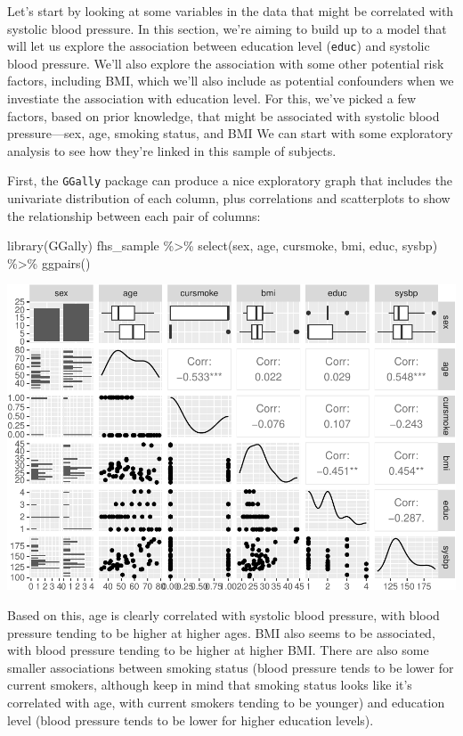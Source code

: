 \documentclass[
]{book}
\newenvironment{Shaded}{\begin{snugshade}}{\end{snugshade}}
\newcommand{\FunctionTok}[1]{\textcolor[rgb]{0.00,0.00,0.00}{#1}}
\newcommand{\NormalTok}[1]{#1}
\newcommand{\SpecialCharTok}[1]{\textcolor[rgb]{0.00,0.00,0.00}{#1}}
\begin{document}
Let's start by looking at some variables in the data that might be correlated
with systolic blood pressure. In this section, we're aiming to build up to a
model that will let us explore the association between education level (\texttt{educ})
and systolic blood pressure. We'll also explore the association with some other
potential risk factors, including BMI, which we'll also include as potential
confounders when we investiate the association with education level. For this,
we've picked a few factors, based on prior knowledge, that might be associated
with systolic blood pressure---sex, age, smoking status, and BMI We can start
with some exploratory analysis to see how they're linked in this sample of
subjects.

First, the \texttt{GGally} package can produce a nice exploratory graph that includes
the univariate distribution of each column, plus correlations and scatterplots
to show the relationship between each pair of columns:

\begin{Shaded}
\begin{Highlighting}[]
\FunctionTok{library}\NormalTok{(GGally)}
\NormalTok{fhs\_sample }\SpecialCharTok{\%\textgreater{}\%} 
  \FunctionTok{select}\NormalTok{(sex, age, cursmoke, bmi, educ, sysbp) }\SpecialCharTok{\%\textgreater{}\%} 
  \FunctionTok{ggpairs}\NormalTok{()}
\end{Highlighting}
\end{Shaded}

\includegraphics{adv_epi_analysis_files/figure-latex/unnamed-chunk-285-1.pdf}

Based on this, age is clearly correlated with systolic blood pressure, with
blood pressure tending to be higher at higher ages. BMI also seems to be
associated, with blood pressure tending to be higher at higher BMI. There are
also some smaller associations between smoking status (blood pressure tends to
be lower for current smokers, although keep in mind that smoking status looks
like it's correlated with age, with current smokers tending to be younger) and
education level (blood pressure tends to be lower for higher education levels).
\end{document}
